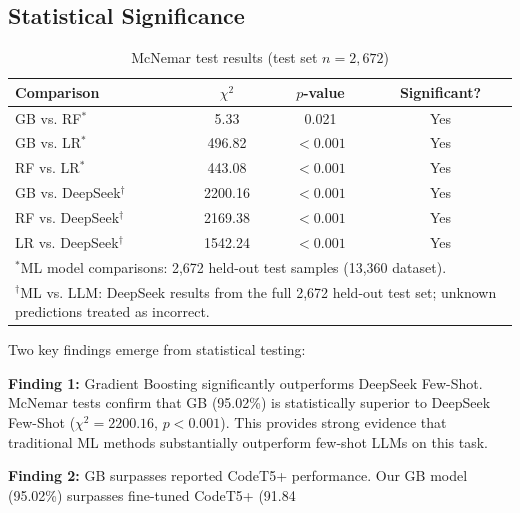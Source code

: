 \documentclass[10pt,a4paper]{article}
\begin{document}
\subsection{Statistical Significance}

\begin{table}[htbp]
\centering
\caption{McNemar test results (test set $n=2{,}672$)}
\label{tab:mcnemar}
\begin{tabular}{@{}lccc@{}}
\toprule
Comparison & $\chi^2$ & $p$-value & Significant? \\
\midrule
GB vs. RF$^{*}$    & 5.33  & 0.021 & Yes \\
GB vs. LR$^{*}$    & 496.82& $<0.001$ & Yes \\
RF vs. LR$^{*}$    & 443.08& $<0.001$ & Yes \\
GB vs. DeepSeek$^{\dagger}$ & 2200.16 & $<0.001$ & Yes \\
RF vs. DeepSeek$^{\dagger}$ & 2169.38 & $<0.001$ & Yes \\
LR vs. DeepSeek$^{\dagger}$ & 1542.24 & $<0.001$ & Yes \\
\multicolumn{4}{l}{\small $^{*}$ML model comparisons: 2,672 held-out test samples (13,360 dataset).} \\
\multicolumn{4}{l}{\small $^{\dagger}$ML vs. LLM: DeepSeek results from the full 2,672 held-out test set; unknown predictions treated as incorrect.} \\
\bottomrule
\end{tabular}
\end{table}

Two key findings emerge from statistical testing:

\begin{flushleft}
\textbf{Finding 1:} Gradient Boosting significantly outperforms DeepSeek Few-Shot. McNemar tests confirm that GB (95.02\%) is statistically superior to DeepSeek Few-Shot ($\chi^2 = 2200.16$, $p < 0.001$). This provides strong evidence that traditional ML methods substantially outperform few-shot LLMs on this task.

\textbf{Finding 2:} GB surpasses reported CodeT5+ performance. Our GB model (95.02\%) surpasses fine-tuned CodeT5+ (91.84\\%
\end{flushleft}

\end{document}
